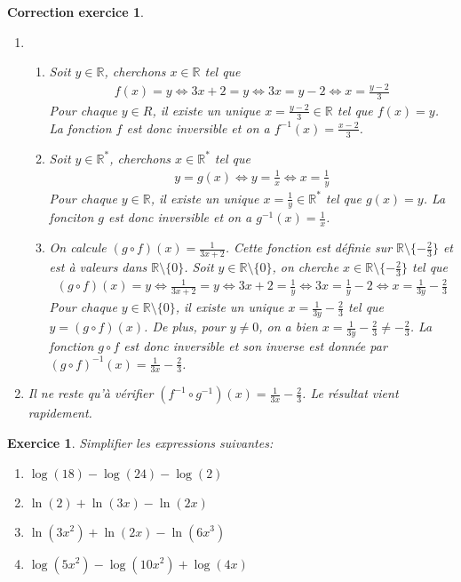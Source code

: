 \documentclass[12pt]{article}
\newtheorem{exercice}{\bf Exercice}
\newtheorem{correction}{\bf Correction exercice}
\newenvironment{exo}{
\begin{exercice}\smallskip\normalfont}{\end{exercice}
}
\newenvironment{cor}{
\begin{correction}\smallskip\normalfont}{\end{correction}
}
\newcommand*{\R}{\mathbb{R}}
\newif\ifcorrige\corrigetrue
\begin{document}
\ifcorrige
\color{magenta}
\begin{cor}
  $\qquad$
\begin{enumerate}
\item
\begin{enumerate}
\item Soit $y \in \R$, cherchons $x \in \R$ tel que
  \begin{align*}
    f(x) = y
    \iff
    3x+2 = y
    \iff
    3x = y-2
    \iff
    x = \frac{y-2}{3}
  \end{align*}
  Pour chaque $y \in R$, il existe un unique $x = \frac{y-2}{3} \in \R$ tel que $f(x) = y$.
  La fonction $f$ est donc inversible et on a $f^{-1}(x) = \frac{x-2}{3}$.
\item Soit $y \in \R^*$, cherchons $x \in \R^*$ tel que
  \begin{align*}
    y = g(x)
    \iff
    y = \frac1x
    \iff
    x = \frac1y
  \end{align*}
  Pour chaque $y \in \R$, il existe un unique $x = \frac{1}{y} \in \R^*$ tel que $g(x) = y$.
  La fonciton $g$ est donc inversible et on a $g^{-1}(x) = \frac1x$.

\item On calcule $(g \circ f) (x) = \frac{1}{3x+2}$.
  Cette fonction est d\'efinie sur $\R \setminus \{ -\frac23 \}$ et est \`a valeurs dans $\R \setminus \{ 0 \}$.
  Soit $y \in \R \setminus \{ 0 \}$, on cherche $x \in \R \setminus \{ -\frac23 \}$
  tel que
  \begin{align*}
    (g \circ f) (x) = y
    \iff
    \frac{1}{3x+2} = y
    \iff
    3x+2 = \frac1y
    \iff
    3x = \frac1y - 2
    \iff
    x = \frac1{3y} - \frac23
  \end{align*}
  Pour chaque $y \in \R \setminus \{ 0 \}$, il existe un unique $x = \frac1{3y} - \frac23$
  tel que $y = (g \circ f) (x)$.
  De plus, pour $y \neq 0$, on a bien $x = \frac1{3y} - \frac23 \neq - \frac23$.
  La fonction $g \circ f$ est donc inversible et son inverse est donn\'ee par
  $(g \circ f)^{-1}(x) = \frac{1}{3x} - \frac23$.
\end{enumerate}
\item Il ne reste qu'\`a v\'erifier
  $(f^{-1} \circ g^{-1})(x) = \frac{1}{3x} - \frac23$.
  Le r\'esultat vient rapidement.
\end{enumerate}
\end{cor}
\color{black}
\fi


\begin{exo} Simplifier les expressions suivantes:
\begin{multicols}{2}
\begin{enumerate}
\item $\log(18) - \log(24) - \log(2)$
\item $\ln(2) + \ln(3x) - \ln (2x)$
\item $\ln(3x^2) + \ln(2x) - \ln (6x^3)$
\item $\log (5x^2) - \log(10x^2) + \log(4x)$
\end{enumerate}
\end{multicols}
\end{exo}
\end{document}
